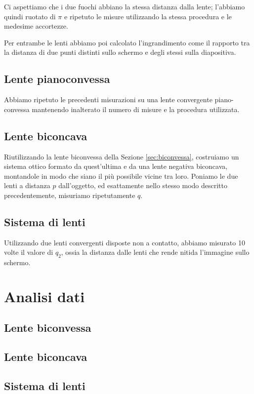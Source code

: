 \documentclass[a4paper]{article}
\begin{document}
        Ci aspettiamo che i due fuochi abbiano la stessa distanza dalla lente; l'abbiamo quindi ruotato di $\pi$ e ripetuto le misure utilizzando la stessa procedura e le medesime accortezze.

        Per entrambe le lenti abbiamo poi calcolato l'ingrandimento come il rapporto tra la distanza di due punti distinti sullo schermo e degli stessi sulla diapositiva.
        
    \subsection{Lente pianoconvessa}    
    Abbiamo ripetuto le precedenti misurazioni su una lente convergente piano-convessa mantenendo inalterato il numero di misure e la procedura utilizzata.
    
    \subsection{Lente biconcava}
    Riutilizzando la lente biconvessa della Sezione \ref{sec:biconvessa}, costruiamo un sistema ottico formato da quest'ultima e da una lente negativa biconcava, montandole in modo che siano il più possibile vicine tra loro. Poniamo le due lenti a distanza $p$ dall'oggetto, ed esattamente nello stesso modo descritto precedentemente, misuriamo ripetutamente $q$.
    
    \subsection{Sistema di lenti}
    Utilizzando due lenti convergenti disposte non a contatto, abbiamo misurato 10 volte il valore di $q_2$, ossia la distanza dalle lenti che rende nitida l'immagine sullo schermo.
\section{Analisi dati}
    \subsection{Lente biconvessa}
    \subsection{Lente biconcava}
    \subsection{Sistema di lenti}
\end{document}
